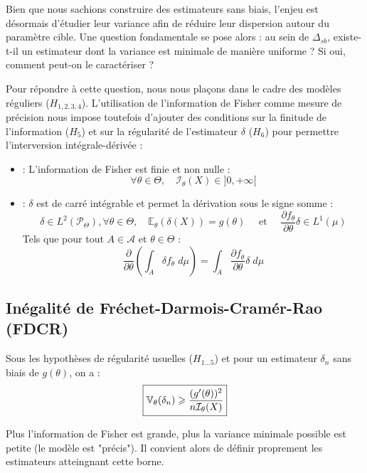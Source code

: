 Bien que nous sachions construire des estimateurs sans biais, l'enjeu est désormais d'étudier leur variance afin de réduire 
leur dispersion autour du paramètre cible. Une question fondamentale se pose alors : au sein de $\Delta_{sb}$, 
existe-t-il un estimateur dont la variance est minimale de manière uniforme ? Si oui, comment peut-on le caractériser ?

Pour répondre à cette question, nous nous plaçons dans le cadre des modèles réguliers ($H_{1, 2, 3, 4}$). 
L'utilisation de l'information de Fisher comme mesure de précision nous impose toutefois d'ajouter des conditions 
sur la finitude de l'information ($H_5$) et sur la régularité de l'estimateur $\delta$ ($H_6$) pour permettre 
l'interversion intégrale-dérivée :

\begin{itemize}[label=--]
    \item[$(H_5)$] : L'information de Fisher est finie et non nulle :
    $$ \forall \theta \in \Theta, \quad \mathcal{I}_\theta(X) \in ]0, + \infty [ $$
    
    \item[$(H_6)$] : $\delta$ est de carré intégrable et permet la dérivation sous le signe somme :
    $$ \delta \in L^2( \mathcal{P}_\Theta), \forall \theta \in \Theta, \quad \mathbb{E}_\theta( \delta(X)) = g( \theta) \quad \text{ et } \quad \frac{\partial f_\theta}{\partial \theta} \delta \in L^1( \mu) $$
    Tels que pour tout $A \in \mathcal{A}$ et $\theta \in \Theta$ :
    $$ \frac{\partial}{\partial \theta} \left( \int_A  \delta f_\theta \; d \mu \right) = \int_A  \frac{\partial f_\theta}{\partial \theta} \delta \; d \mu $$
\end{itemize}

\subsection{Inégalité de Fréchet-Darmois-Cramér-Rao (FDCR)}

\begin{theorem}
    Sous les hypothèses de régularité usuelles ($H_{1 \dots 5}$) et pour un estimateur $\delta_n$ sans biais de $g(\theta)$, on a :
    \begin{equation}
        \boxed{\mathbb{V}_\theta( \delta_n) \geqslant \frac{(g'( \theta))^2}{n \mathcal{I}_\theta(X)}}
    \end{equation}
\end{theorem}

Plus l'information de Fisher est grande, plus la variance minimale possible est petite (le modèle est "précis").
Il convient alors de définir proprement les estimateurs atteingnant cette borne. 

